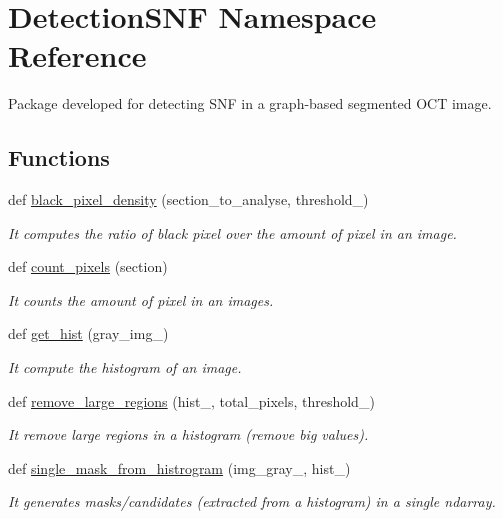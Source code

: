 \hypertarget{namespaceDetectionSNF}{}\section{Detection\+S\+NF Namespace Reference}
\label{namespaceDetectionSNF}


Package developed for detecting S\+NF in a graph-\/based segmented O\+CT image.  


\subsection*{Functions}
\begin{DoxyCompactItemize}
\item 
def \hyperlink{namespaceDetectionSNF_a4c61799b0b302792b11c396a63a39d11}{black\+\_\+pixel\+\_\+density} (section\+\_\+to\+\_\+analyse, threshold\+\_\+)
\begin{DoxyCompactList}\small\item\em It computes the ratio of black pixel over the amount of pixel in an image. \end{DoxyCompactList}\item 
def \hyperlink{namespaceDetectionSNF_a40850a30b587d61f901033e457f6175b}{count\+\_\+pixels} (section)
\begin{DoxyCompactList}\small\item\em It counts the amount of pixel in an images. \end{DoxyCompactList}\item 
def \hyperlink{namespaceDetectionSNF_a58869b8b023625adad267d3d5fac1654}{get\+\_\+hist} (gray\+\_\+img\+\_\+)
\begin{DoxyCompactList}\small\item\em It compute the histogram of an image. \end{DoxyCompactList}\item 
def \hyperlink{namespaceDetectionSNF_ad3a1086403a97140ea53e95b774c2282}{remove\+\_\+large\+\_\+regions} (hist\+\_\+, total\+\_\+pixels, threshold\+\_\+)
\begin{DoxyCompactList}\small\item\em It remove large regions in a histogram (remove big values). \end{DoxyCompactList}\item 
def \hyperlink{namespaceDetectionSNF_ae0e0c9649e3083ac139ac2caba942e25}{single\+\_\+mask\+\_\+from\+\_\+histrogram} (img\+\_\+gray\+\_\+, hist\+\_\+)
\begin{DoxyCompactList}\small\item\em It generates masks/candidates (extracted from a histogram) in a single ndarray. \end{DoxyCompactList}\item 

\end{DoxyCompactItemize}
